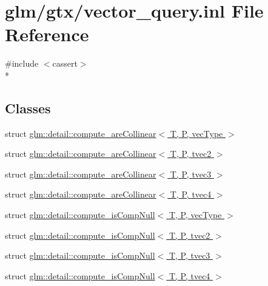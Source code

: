 \hypertarget{vector__query_8inl}{\section{glm/gtx/vector\-\_\-query.inl File Reference}
\label{vector__query_8inl}
}
{\ttfamily \#include $<$cassert$>$}\\*
\subsection*{Classes}
\begin{DoxyCompactItemize}
\item 
struct \hyperlink{structglm_1_1detail_1_1compute__areCollinear}{glm\-::detail\-::compute\-\_\-are\-Collinear$<$ T, P, vec\-Type $>$}
\item 
struct \hyperlink{structglm_1_1detail_1_1compute__areCollinear_3_01T_00_01P_00_01tvec2_01_4}{glm\-::detail\-::compute\-\_\-are\-Collinear$<$ T, P, tvec2 $>$}
\item 
struct \hyperlink{structglm_1_1detail_1_1compute__areCollinear_3_01T_00_01P_00_01tvec3_01_4}{glm\-::detail\-::compute\-\_\-are\-Collinear$<$ T, P, tvec3 $>$}
\item 
struct \hyperlink{structglm_1_1detail_1_1compute__areCollinear_3_01T_00_01P_00_01tvec4_01_4}{glm\-::detail\-::compute\-\_\-are\-Collinear$<$ T, P, tvec4 $>$}
\item 
struct \hyperlink{structglm_1_1detail_1_1compute__isCompNull}{glm\-::detail\-::compute\-\_\-is\-Comp\-Null$<$ T, P, vec\-Type $>$}
\item 
struct \hyperlink{structglm_1_1detail_1_1compute__isCompNull_3_01T_00_01P_00_01tvec2_01_4}{glm\-::detail\-::compute\-\_\-is\-Comp\-Null$<$ T, P, tvec2 $>$}
\item 
struct \hyperlink{structglm_1_1detail_1_1compute__isCompNull_3_01T_00_01P_00_01tvec3_01_4}{glm\-::detail\-::compute\-\_\-is\-Comp\-Null$<$ T, P, tvec3 $>$}
\item 
struct \hyperlink{structglm_1_1detail_1_1compute__isCompNull_3_01T_00_01P_00_01tvec4_01_4}{glm\-::detail\-::compute\-\_\-is\-Comp\-Null$<$ T, P, tvec4 $>$}
\end{DoxyCompactItemize}
